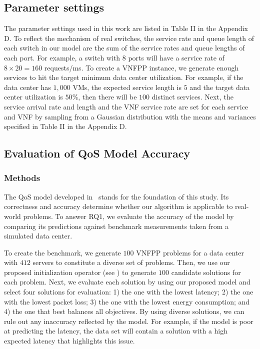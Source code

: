 \subsection{Parameter settings}
The parameter settings used in this work are listed in Table II in the Appendix D. To reflect the mechanism of real switches, the service rate and queue length of each switch in our model are the sum of the service rates and queue lengths of each port. For example, a switch with $8$ ports will have a service rate of $8\times 20=160$ requests/ms. To create a VNFPP instance, we generate enough services to hit the target minimum data center utilization. For example, if the data center has $1,000$ VMs, the expected service length is $5$ and the target data center utilization is $50$\%, then there will be $100$ distinct services. Next, the service arrival rate and length and the VNF service rate are set for each service and VNF by sampling from a Gaussian distribution with the means and variances specified in Table II in the Appendix D.

\subsection{Evaluation of QoS Model Accuracy}
\label{sec:model_accuracy}

\subsubsection{Methods}
The QoS model developed in~ stands for the foundation of this study. Its correctness and accuracy determine whether our algorithm is applicable to real-world problems. To answer RQ1, we evaluate the accuracy of the model by comparing its predictions against benchmark measurements taken from a simulated data center.

To create the benchmark, we generate $100$ VNFPP problems for a data center with $412$ servers to constitute a diverse set of problems. Then, we use our proposed initialization operator (see ) to generate $100$ candidate solutions for each problem. Next, we evaluate each solution by using our proposed model and select four solutions for evaluation: 1) the one with the lowest latency; 2) the one with the lowest packet loss; 3) the one with the lowest energy consumption; and 4) the one that best balances all objectives. By using diverse solutions, we can rule out any inaccuracy reflected by the model. For example, if the model is poor at predicting the latency, the data set will contain a solution with a high expected latency that highlights this issue. %

